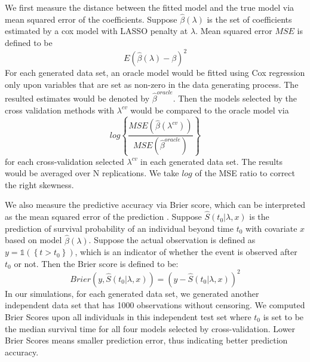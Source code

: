 \par We first measure the distance between the fitted model and the true model via mean squared error of the coefficients. Suppose $\hat{\beta}(\lambda)$ is the set of coefficients estimated by a cox model with LASSO penalty at $\lambda$. Mean squared error $MSE$ is defined to be 
\begin{equation}
E(\hat{\beta}(\lambda) - \beta)^2
\end{equation}
For each generated data set, an oracle model would be fitted using Cox regression only upon variables that are set as non-zero in the data generating process. The resulted estimates would be denoted by $\hat{\beta}^{oracle}$. Then the models selected by the cross validation methods with $\lambda^{cv}$ would be compared to the oracle model via 
\begin{equation}
log\left\{ \frac{MSE(\hat{\beta}(\lambda^{cv}))}{MSE(\hat{\beta}^{oracle})} \right\}
\end{equation}
for each cross-validation selected $\lambda^{cv}$ in each generated data set. The results would be averaged over N replications. We take $log$ of the MSE ratio to correct the right skewness.


\par We also measure the predictive accuracy via Brier score, which can be interpreted as the mean squared error of the prediction \citep{VanHouwelingen2011}. Suppose $\hat{S}(t_0|\lambda,x)$ is the prediction of survival probability of an individual beyond time $t_0$ with covariate $x$ based on model $\hat{\beta}(\lambda)$. Suppose the actual observation is defined as $y = \mathbb{1}(\left\{ t > t_{0}\right\})$, which is an indicator of whether the event is observed after $t_0$ or not. Then the Brier score is defined to be:
\begin{equation}
	Brier(y, \hat{S}(t_0|\lambda,x)) = (y - \hat{S}(t_0|\lambda,x))^2
\end{equation}
In our simulations, for each generated data set, we generated another independent data set that has 1000 observations without censoring. We computed Brier Scores upon all individuals in this independent test set where $t_0$ is set to be the median survival time for all four models selected by cross-validation. Lower Brier Scores means smaller prediction error, thus indicating better prediction accuracy.

